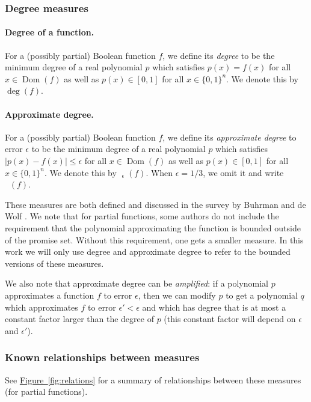 \documentclass[10pt,a4paper]{article}
\theoremstyle{definition}
\newcommand{\fig}[1]{\hyperref[fig:#1]{Figure~\ref*{fig:#1}}}
\DeclareMathOperator{\Dom}{Dom}
\newcommand{\B}{\{0,1\}}
\renewcommand{\>}{\rangle}
\newcommand{\<}{\langle}
\DeclareMathOperator{\adeg}{\widetilde{\deg}}
\begin{document}
\subsubsection{Degree measures}

\paragraph{Degree of a function.} For a
(possibly partial) Boolean function $f$, we define
its \emph{degree} to be the minimum degree of a real
polynomial $p$ which satisfies $p(x)=f(x)$
for all $x\in\Dom(f)$ as well as $p(x)\in[0,1]$ for
all $x\in\B^n$. We denote this by $\deg(f)$.

\paragraph{Approximate degree.} For a (possibly partial)
Boolean function $f$, we define its \emph{approximate degree}
to error $\epsilon$
to be the minimum degree of a real polynomial $p$
which satisfies $|p(x)-f(x)|\le \epsilon$
for all $x\in\Dom(f)$
as well as $p(x)\in[0,1]$ for all $x\in\B^n$.
We denote this by $\adeg_\epsilon(f)$.
When $\epsilon=1/3$, we omit it and write $\adeg(f)$.

These measures are both defined and discussed in the
survey by Buhrman and de Wolf \cite{BdW02}.
We note that for partial functions, some authors do not
include the requirement that the polynomial approximating
the function is bounded outside of the promise set.
Without this requirement, one gets a smaller measure.
In this work we will only use degree and approximate
degree to refer to the bounded versions of these measures.

We also note that approximate degree can be \emph{amplified}:
if a polynomial $p$ approximates a function $f$ to error
$\epsilon$, then we can modify $p$ to get a polynomial $q$
which approximates $f$ to error $\epsilon'<\epsilon$
and which has degree that is at most a constant factor
larger than the degree of $p$ (this constant
factor will depend on $\epsilon$ and $\epsilon'$).

\subsubsection{Known relationships between measures}

See \fig{relations} for a summary of relationships
between these measures (for partial functions).
\end{document}
